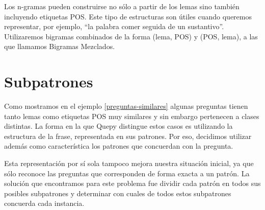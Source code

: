 Los n-gramas pueden construirse no sólo a partir de los lemas sino también incluyendo etiquetas POS. Este tipo de estructuras son útiles cuando queremos representar, por ejemplo, ``la palabra comer seguida de un sustantivo''. Utilizaremos bigramas combinados de la forma (lema, POS) y (POS, lema), a las que llamamos Bigramas Mezclados.

\section{Subpatrones}

Como mostramos en el ejemplo \ref{preguntas-similares} algunas preguntas tienen tanto lemas como etiquetas POS muy similares y sin embargo pertenecen a clases distintas. La forma en la que Quepy distingue estos casos es utilizando la estructura de la frase, representada en sus patrones. Por eso, decidimos utilizar además como característica los patrones que concuerdan con la pregunta.

Esta representación por sí sola tampoco mejora nuestra situación inicial, ya que sólo reconoce las preguntas que corresponden de forma exacta a un patrón. La solución que encontramos para este problema fue dividir cada patrón en todos sus posibles subpatrones y determinar con cuales de todos estos subpatrones concuerda cada instancia.

